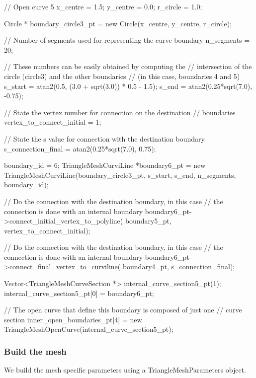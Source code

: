  
\begin{DoxyCodeInclude}
  \textcolor{comment}{// Open curve 5}
  x\_centre = 1.5;
  y\_centre = 0.0;
  r\_circle = 1.0;

  Circle * boundary\_circle3\_pt = \textcolor{keyword}{new} Circle(x\_centre, y\_centre, r\_circle);

  \textcolor{comment}{// Number of segments used for representing the curve boundary}
  n\_segments = 20;

  \textcolor{comment}{// These numbers can be easily obtained by computing the}
  \textcolor{comment}{// intersection of the circle (circle3) and the other boundaries}
  \textcolor{comment}{// (in this case, boundaries 4 and 5)}
  s\_start = atan2(0.5, (3.0 + sqrt(3.0)) * 0.5 - 1.5);
  s\_end = atan2(0.25*sqrt(7.0), -0.75);

  \textcolor{comment}{// State the vertex number for connection on the destination}
  \textcolor{comment}{// boundaries}
  vertex\_to\_connect\_initial = 1;

  \textcolor{comment}{// State the s value for connection with the destination boundary}
  s\_connection\_final = atan2(0.25*sqrt(7.0), 0.75);

  boundary\_id = 6;
  TriangleMeshCurviLine *boundary6\_pt =
    \textcolor{keyword}{new} TriangleMeshCurviLine(boundary\_circle3\_pt,
          s\_start,
          s\_end,
          n\_segments,
          boundary\_id);

  \textcolor{comment}{// Do the connection with the destination boundary, in this case}
  \textcolor{comment}{// the connection is done with an internal boundary}
  boundary6\_pt->connect\_initial\_vertex\_to\_polyline(
                                boundary5\_pt,
                                vertex\_to\_connect\_initial);

  \textcolor{comment}{// Do the connection with the destination boundary, in this case}
  \textcolor{comment}{// the connection is done with an internal boundary}
  boundary6\_pt->connect\_final\_vertex\_to\_curviline(
                                boundary4\_pt,
                                s\_connection\_final);

  Vector<TriangleMeshCurveSection *> internal\_curve\_section5\_pt(1);
  internal\_curve\_section5\_pt[0] = boundary6\_pt;

  \textcolor{comment}{// The open curve that define this boundary is composed of just one}
  \textcolor{comment}{// curve section}
  inner\_open\_boundaries\_pt[4] =
      \textcolor{keyword}{new} TriangleMeshOpenCurve(internal\_curve\_section5\_pt);

\end{DoxyCodeInclude}
\hypertarget{index_create_mesh}{}\subsubsection{Build the mesh}\label{index_create_mesh}
We build the mesh specific parameters using a {\ttfamily Triangle\+Mesh\+Parameters} object.

